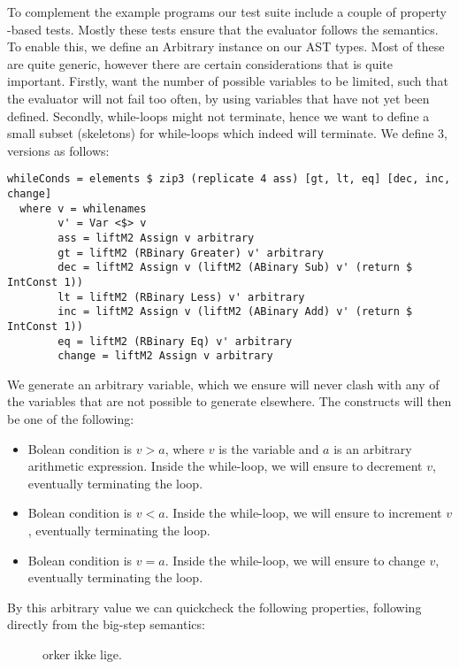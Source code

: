 To complement the example programs our test suite include a couple of property -based tests. Mostly these tests ensure that the evaluator follows the semantics.
To enable this, we define an Arbitrary instance on our AST types. Most of these are quite generic, however there are certain considerations that is quite important.
Firstly, want the number of possible variables to be limited, such that the evaluator will not fail too often, by using variables that have not yet been defined.
Secondly, while-loops might not terminate, hence we want to define a small subset (skeletons) for while-loops which indeed will terminate. We define 3, versions as follows:
\begin{lstlisting}
whileConds = elements $ zip3 (replicate 4 ass) [gt, lt, eq] [dec, inc, change]
  where v = whilenames
        v' = Var <$> v
        ass = liftM2 Assign v arbitrary
        gt = liftM2 (RBinary Greater) v' arbitrary
        dec = liftM2 Assign v (liftM2 (ABinary Sub) v' (return $ IntConst 1))
        lt = liftM2 (RBinary Less) v' arbitrary
        inc = liftM2 Assign v (liftM2 (ABinary Add) v' (return $ IntConst 1))
        eq = liftM2 (RBinary Eq) v' arbitrary
        change = liftM2 Assign v arbitrary
\end{lstlisting}
We generate an arbitrary variable, which we ensure will never clash with any of the variables that are not possible to generate elsewhere. The constructs will then be one of the following:
\begin{itemize}
  \item Bolean condition is $v > a$, where $v$ is the variable and $a$ is an arbitrary arithmetic expression. Inside the while-loop, we will ensure to decrement $v$, eventually terminating the loop.
  \item Bolean condition is $v < a$. Inside the while-loop, we will ensure to increment $v$, eventually terminating the loop.
\item Bolean condition is $v = a$. Inside the while-loop, we will ensure to change $v$, eventually terminating the loop.
\end{itemize}

By this arbitrary value we can quickcheck the following properties, following directly from the big-step semantics:

\begin{figure}
orker ikke lige.
\end{figure}

